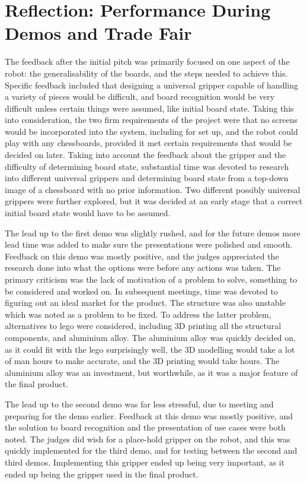 \documentclass[onecolumn]{IEEEtran}
\begin{document}
\section{Reflection: Performance During Demos and Trade Fair}
The feedback after the initial pitch was primarily focused on one aspect of the robot: the generalisability of the boards, and the steps needed to achieve this. Specific feedback included that designing a universal gripper capable of handling a variety of pieces would be difficult, and board recognition would be very difficult unless certain things were assumed, like initial board state. Taking this into consideration, the two firm requirements of the project were that no screens would be incorporated into the system, including for set up, and the robot could play with any chessboards, provided it met certain requirements that would be decided on later. Taking into account the feedback about the gripper and the difficulty of determining board state, substantial time was devoted to research into different universal grippers and determining board state from a top-down image of a chessboard with no prior information. Two different possibly universal grippers were further explored, but it was decided at an early stage that a correct initial board state would have to be assumed. \par
The lead up to the first demo was slightly rushed, and for the future demos more lead time was added to make sure the presentations were polished and smooth. Feedback on this demo was mostly positive, and the judges appreciated the research done into what the options were before any actions was taken. The primary criticism was the lack of motivation of a problem to solve, something to be considered and worked on. In subsequent meetings, time was devoted to figuring out an ideal market for the product. The structure was also unstable which was noted as a problem to be fixed. To address the latter problem, alternatives to lego were considered, including 3D printing all the structural components, and aluminium alloy. The aluminium alloy was quickly decided on, as it could fit with the lego surprisingly well, the 3D modelling would take a lot of man hours to make accurate, and the 3D printing would take hours. The aluminium alloy was an investment, but worthwhile, as it was a major feature of the final product. \par
The lead up to the second demo was far less stressful, due to meeting and preparing for the demo earlier. Feedback at this demo was mostly positive, and the solution to board recognition and the presentation of use cases were both noted. The judges did wish for a place-hold gripper on the robot, and this was quickly implemented for the third demo, and for testing between the second and third demos. Implementing this gripper ended up being very important, as it ended up being the gripper used in the final product. \par
\end{document}
